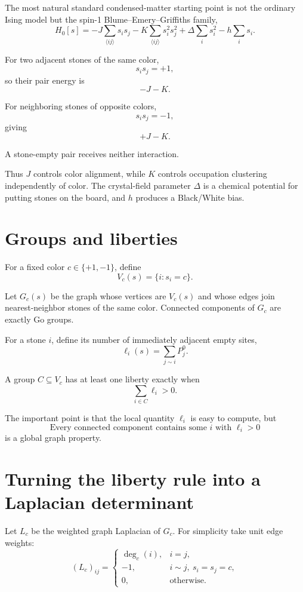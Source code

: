 \documentclass[11pt]{article}
\begin{document}
The most natural standard condensed-matter starting point is not the ordinary Ising model but the spin-1 Blume--Emery--Griffiths family,
\[
\boxed{
H_0[s]
=
-J\sum_{\langle ij\rangle}s_i s_j
-K\sum_{\langle ij\rangle}s_i^2s_j^2
+\Delta\sum_i s_i^2
-h\sum_i s_i.
}
\]

For two adjacent stones of the same color,
\[
s_i s_j=+1,
\]
so their pair energy is
\[
-J-K.
\]

For neighboring stones of opposite colors,
\[
s_i s_j=-1,
\]
giving
\[
+J-K.
\]

A stone-empty pair receives neither interaction.

Thus \(J\) controls color alignment, while \(K\) controls occupation clustering independently of color. The crystal-field parameter \(\Delta\) is a chemical potential for putting stones on the board, and \(h\) produces a Black/White bias.

\section{Groups and liberties}

For a fixed color \(c\in\{+1,-1\}\), define
\[
V_c(s)=\{i:s_i=c\}.
\]

Let \(G_c(s)\) be the graph whose vertices are \(V_c(s)\) and whose edges join nearest-neighbor stones of the same color. Connected components of \(G_c\) are exactly Go groups.

For a stone \(i\), define its number of immediately adjacent empty sites,
\[
\ell_i(s)
=
\sum_{j\sim i}P_j^0.
\]

A group \(C\subseteq V_c\) has at least one liberty exactly when
\[
\sum_{i\in C}\ell_i>0.
\]

The important point is that the local quantity \(\ell_i\) is easy to compute, but
\[
\boxed{
\text{Every connected component contains some }i\text{ with }\ell_i>0
}
\]
is a global graph property.

\section{Turning the liberty rule into a Laplacian determinant}

Let \(L_c\) be the weighted graph Laplacian of \(G_c\). For simplicity take unit edge weights:
\[
(L_c)_{ij}
=
\begin{cases}
\deg_c(i),&i=j,\\
-1,&i\sim j,\ s_i=s_j=c,\\
0,&\text{otherwise}.
\end{cases}
\]
\end{document}
